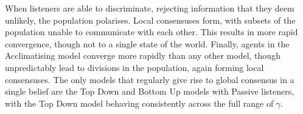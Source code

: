 When listeners are able to discriminate, rejecting information that they deem unlikely, the population polarises. Local consensuses form, with subsets of the population unable to communicate with each other. This results in more rapid convergence, though not to a single state of the world. Finally, agents in the Acclimatising model converge more rapidly than any other model, though unpredictably lead to divisions in the population, again forming local consensuses. The only models that regularly give rise to global consensus in a single belief are the Top Down and Bottom Up models with Passive listeners, with the Top Down model behaving consistently across the full range of $\gamma$. 
